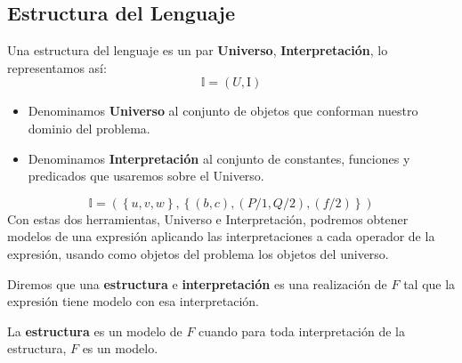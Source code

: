 \subsection{Estructura del Lenguaje}
\noindent Una estructura del lenguaje es un par \textbf{Universo}, \textbf{Interpretación}, lo representamos así:
\[\mathbb{I} = (U, \mathrm{I})\]
\begin{itemize}
        \item Denominamos \textbf{Universo} al conjunto de objetos que conforman nuestro dominio del problema.
        \item Denominamos \textbf{Interpretación} al conjunto de constantes, funciones y predicados que usaremos sobre el Universo.
\end{itemize}
\[
        \mathbb{I} = (\left \{ u,v,w \right \}, \left \{ (b,c),(P/1,Q/2),(f/2) \right \})
\]
\noindent Con estas dos herramientas, Universo e Interpretación, podremos obtener modelos de una expresión aplicando las interpretaciones a cada operador de la expresión, usando como objetos del problema los objetos del universo.
\par\noindent Diremos que una \textbf{estructura} e \textbf{interpretación} es una realización de \(F\) tal que la expresión tiene modelo con esa interpretación.
\par \noindent La \textbf{estructura} es un modelo de \(F\) cuando para toda interpretación de la estructura, \(F\) es un modelo.